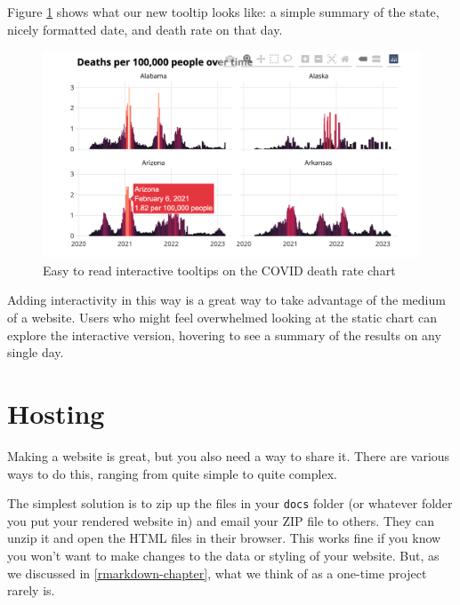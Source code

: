 \documentclass[
]{book}
\begin{document}
Figure \ref{fig:covid-website-tooltip} shows what our new tooltip looks like: a simple summary of the state, nicely formatted date, and death rate on that day.

\begin{figure}
\includegraphics[width=1\linewidth]{assets/covid-website-tooltip} \caption{Easy to read interactive tooltips on the COVID death rate chart}\label{fig:covid-website-tooltip}
\end{figure}

Adding interactivity in this way is a great way to take advantage of the medium of a website. Users who might feel overwhelmed looking at the static chart can explore the interactive version, hovering to see a summary of the results on any single day.

\hypertarget{hosting}{%
\section*{Hosting}\label{hosting}}

Making a website is great, but you also need a way to share it. There are various ways to do this, ranging from quite simple to quite complex.

The simplest solution is to zip up the files in your \texttt{docs} folder (or whatever folder you put your rendered website in) and email your ZIP file to others. They can unzip it and open the HTML files in their browser. This works fine if you know you won't want to make changes to the data or styling of your website. But, as we discussed in \ref{rmarkdown-chapter}, what we think of as a one-time project rarely is.
\end{document}
